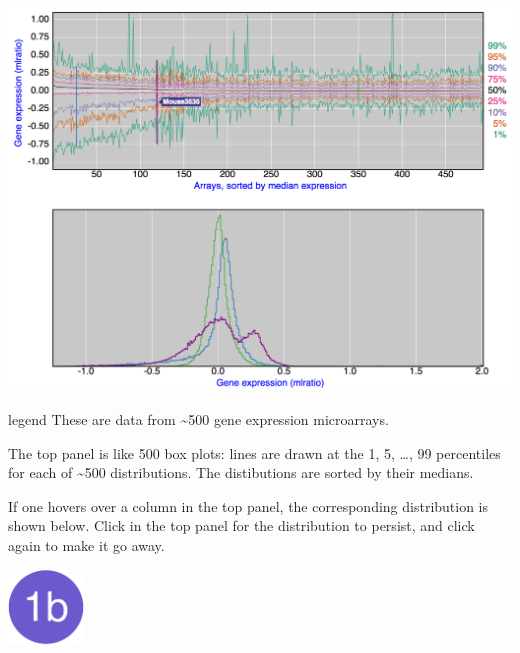 \documentclass[final,plain]{beamer}
\newlength{\onecolwid}
\newlength{\twocolwid}
\newcommand{\colthreevsep}{\vspace{12mm}}
\begin{document}
\begin{frame}[t]
\begin{columns}[t]
\begin{column}{\twocolwid}
\begin{columns}[t]
\begin{column}{\onecolwid}
        \centerline{\href{http://www.biostat.wisc.edu/~kbroman/posters/ENAR2014/1a}{\includegraphics[width=\onecolwid]{Figs/1a.png}}}

      \vspace{10mm} %

        \begin{beamercolorbox}[sep=1em, wd=\onecolwid]{legend} \rmfamily
           These are data from {\textasciitilde}500 gene expression
           microarrays. 

           \vspace{12pt}

           The top panel is like 500 box plots:
           lines are drawn at the 1, 5, \dots, 99 percentiles
           for each of {\textasciitilde}500 distributions. The
           distibutions are sorted by their medians.

           \vspace{12pt}

           If one hovers over a column in the top panel, the corresponding distribution
          is shown below. Click in the top panel for the distribution
          to persist, and click again to make it go away.
        \end{beamercolorbox}


    \colthreevsep %

        \href{http://www.biostat.wisc.edu/~kbroman/posters/ENAR2014/1b}{\includegraphics[width=2cm]{Figs/dot1b.pdf}}


\end{column}
\end{columns}
\end{column}
\end{columns}
\end{frame}
\end{document}
